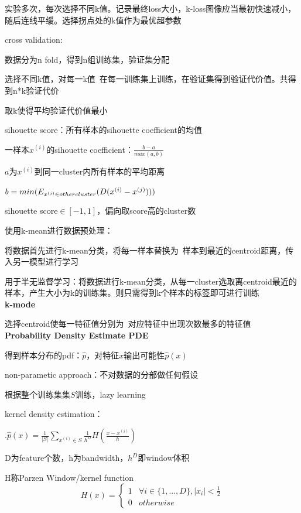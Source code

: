 \documentclass[UTF8]{ctexart}
\begin{document}
  \quad \quad \quad 实验多次，每次选择不同k值。记录最终loss大小，k-loss图像应当最初快速减小，随后连线平缓。选择拐点处的k值作为最优超参数

  \quad \quad cross validation:

  \quad \quad \quad 数据分为n fold，得到n组训练集，验证集分配

  \quad \quad \quad 选择不同k值，对每一k值\ 在每一训练集上训练，在验证集得到验证代价值。共得到n*k验证代价

  \quad \quad \quad 取k使得平均验证代价值最小

  \quad \quad sihouette score：所有样本的sihouette coefficient的均值

  \quad \quad \quad 一样本$x^{(i)}$的sihouette coefficient：$\frac{b-a}{max(a, b)}$

  \quad \quad \quad \quad $a$为$x^{(i)}$到同一cluster内所有样本的平均距离
  
  \quad \quad \quad \quad $b = min(E_{x^{(j)} \in other \space cluster}(D(x^{(i)} - x^{(j)})))$

  \quad \quad \quad sihouette score$\in [-1, 1]$，偏向取score高的cluster数

  使用k-mean进行数据预处理：

  \quad 将数据首先进行k-mean分类，将每一样本替换为\ 样本到最近的centroid距离，传入另一模型进行学习

  \quad 用于半无监督学习：将数据进行k-mean分类，从每一cluster选取离centroid最近的样本，产生大小为k的训练集。则只需得到k个样本的标签即可进行训练\\
\textbf{k-mode}

  选择centroid使每一特征值分别为\ 对应特征中出现次数最多的特征值\\
\textbf{Probability Density Estimate PDE}

  得到样本分布的pdf：$\hat{p}$，对特征$x$输出可能性$\hat{p}(x)$

  non-parametic approach：不对数据的分部做任何假设
  
  \quad 根据整个训练集集$S$训练，lazy learning

  \quad kernel density estimation：

  \quad {}.$\hat{p}(x) = \frac{1}{|S|}\sum_{x^{(i)} \in S}\frac{1}{h^D}H(\frac{x - x^{(i)}}{h})$

  \quad \quad \quad D为feature个数，h为bandwidth，$h^D$即window体积

  \quad \quad \quad H称Parzen Window/kernel function\begin{equation*}
    H(x) = \begin{cases}
    1 &\forall i \in \{1, ..., D\}, |x_i| < \frac{1}{2}\\
    0 & otherwise
    \end{cases}
  \end{equation*}
  
\end{document}
